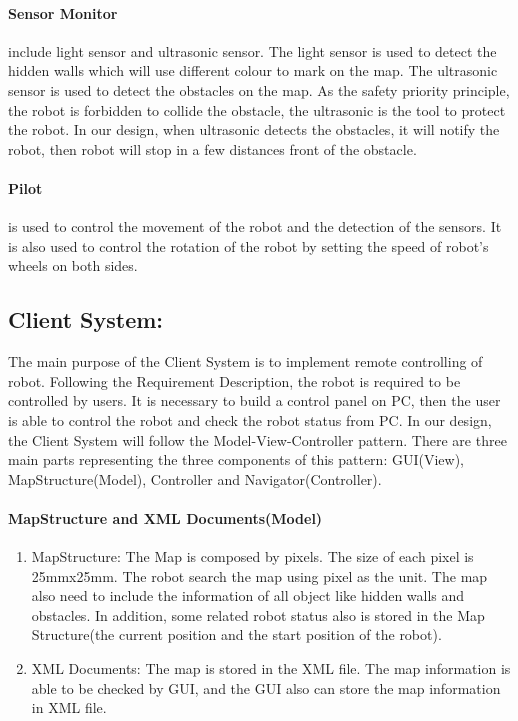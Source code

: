 \documentclass[11pt, a4paper]{report}
\begin{document}
\paragraph {Sensor Monitor} include light sensor and ultrasonic sensor. The light sensor is used to detect the hidden walls which will use different colour to mark on the map. The ultrasonic sensor is used to detect the obstacles on the map. As the safety priority principle, the robot is forbidden to collide the obstacle, the ultrasonic is the tool to protect the robot. In our design, when ultrasonic detects the obstacles, it will notify the robot, then robot will stop in a few distances front of the obstacle.
\paragraph {Pilot} is used to control the movement of the robot and the detection of the sensors. It is also used to control the rotation of the robot by setting the speed of robot's wheels on both sides.      


\subsection{Client System: }
The main purpose of the Client System is to implement remote controlling of robot. Following the Requirement Description, the robot is required to be controlled by users. It is necessary to build a control panel on PC, then the user is able to control the robot and check the robot status from PC. In our design, the Client System will follow the Model-View-Controller pattern. There are three main parts representing the three components of this pattern: GUI(View), MapStructure(Model), Controller and Navigator(Controller).    
\newline
\paragraph{MapStructure and XML Documents(Model)} 
\begin{enumerate}
\item MapStructure: The Map is composed by pixels. The size of each pixel is 25mmx25mm. The robot search the map using pixel as the unit. The map also need to include the information of all object like hidden walls and obstacles. In addition, some related robot status also is stored in the Map Structure(the current position and the start position of the robot).
\item XML Documents: The map is stored in the XML file. The map information is able to be checked by GUI, and the GUI also can store the map information in XML file.
\end{enumerate}
\end{document}
